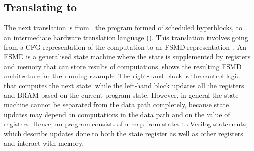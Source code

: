 

\subsection{Translating \rtlpar{} to \htl{}}\label{sec:itv:rtlpar-to-htl}

The next translation is from \rtlpar{}, the program formed of scheduled
hyperblocks, to an intermediate hardware translation language (\htl{}).  This
translation involves going from a \gls{CFG} representation of the computation to
an \gls{FSMD} representation~\cite{hwang99_ffplp}. An \gls{FSMD} is a
generalised state machine where the state is supplemented by registers and
memory that can store results of computations.  
shows the resulting \gls{FSMD} architecture for the running example. The
right-hand block is the control logic that computes the next state, while the
left-hand block updates all the registers and \gls{BRAM} based on the current
program state.  However, in general the state machine cannot be separated from
the data path completely, because state updates may depend on computations in
the data path and on the value of registers.  Hence, an \htl{} program consists
of a map from states to Verilog statements, which describe updates done to both
the state register as well as other registers and interact with memory.


